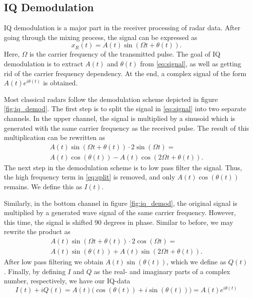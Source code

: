 
\begin{appendices}

\chapter{IQ Demodulation}
IQ demodulation is a major part in the receiver processing of radar data. After going through the mixing process, the signal can be expressed as \citep{lee_1991}
\begin{equation}
\label{eq:signal}
	x_R(t)=A(t)\sin(\Omega t+\theta(t)).
\end{equation}
Here, $\Omega$ is the carrier frequency of the transmitted pulse. The goal of IQ demodulation is to extract $A(t)$ and $\theta(t)$ from \eqref{eq:signal}, as well as getting rid of the carrier frequency dependency. At the end, a complex signal of the form $A(t)e^{i\theta(t)}$ is obtained.

Most classical radars follow the demodulation scheme depicted in figure \ref{fig:iq_demod}. The first step is to split the signal in \eqref{eq:signal} into two separate channels. In the upper channel, the signal is multiplied by a sinusoid which is generated with the same carrier frequency as the received pulse. The result of this multiplication can be rewritten as
\begin{gather}
	 A(t)\sin(\Omega t+\theta(t))\cdot 2\sin(\Omega t) = \\
	\label{eq:split}
 	 A(t)\cos(\theta(t))-A(t)\cos(2\Omega t+\theta(t)).
\end{gather}
The next step in the demodulation scheme is to low pass filter the signal. Thus, the high frequency term in \eqref{eq:split} is removed, and only $A(t)\cos(\theta(t))$ remains. We define this as $I(t)$.

Similarly, in the bottom channel in figure \ref{fig:iq_demod}, the original signal is multiplied by a generated wave signal of the same carrier frequency. However, this time, the signal is shifted 90 degrees in phase. Similar to before, we may rewrite the product as
\begin{gather}
	 A(t)\sin(\Omega t+\theta(t))\cdot 2\cos(\Omega t) = \\
	\label{eq:split2}
 	 A(t)\sin(\theta(t))+A(t)\sin(2\Omega t+\theta(t)).
\end{gather}
After low pass filtering we obtain $A(t)\sin(\theta(t))$, which we define as $Q(t)$. Finally, by defining $I$ and $Q$ as the real- and imaginary parts of a complex number, respectively, we have our IQ-data
\begin{equation}
	I(t)+iQ(t)=A(t)\Big(\cos(\theta(t))+i\sin(\theta(t))\Big)=A(t)e^{i\theta(t)}
\end{equation}


\end{appendices}
